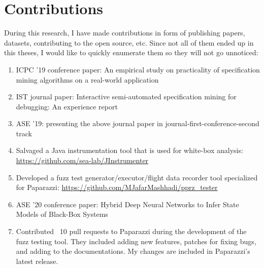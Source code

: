 \dedication{To the ones who made this a smoother journey.} 


\tableofcontents


\listoftables


\listoffigures


\chapter{Contributions}
During this research, I have made contributions in form of publishing papers, datasets, contributing to the open source, etc. 
Since not all of them ended up in this theses, I would like to quickly enumerate them so they will not go unnoticed:
\begin{enumerate}
    \item ICPC '19 conference paper: An empirical study on practicality of specification mining algorithms on a real-world application
    \item IST journal paper: Interactive semi-automated specification mining for debugging: An experience report
    \item ASE '19: presenting the above journal paper in journal-first-conference-second track
    \item Salvaged a Java instrumentation tool that is used for white-box analysis: \url{https://github.com/sea-lab/JInstrumenter}
    \item Developed a fuzz test generator/executor/flight data recorder tool specialized for Paparazzi: \url{https://github.com/MJafarMashhadi/pprz_tester}
    \item ASE '20 conference paper: Hybrid Deep Neural Networks to Infer State Models of Black-Box Systems
    \item Contributed ~10 pull requests to Paparazzi during the development of the fuzz testing tool. They included adding new features, patches for fixing bugs, and adding to the documentations. My changes are included in Paparazzi's latest release.
\end{enumerate}

